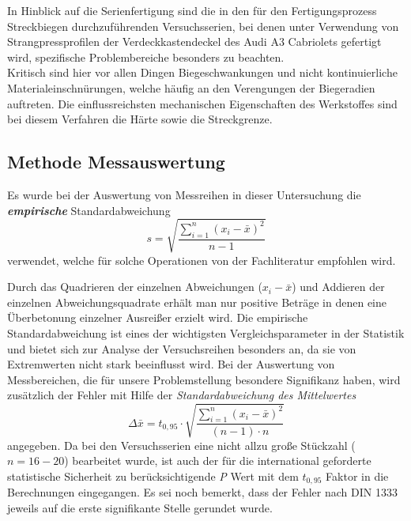 \documentclass[12pt,a4paper,parskip,twoside,BCOR5mm,headsepline]{scrartcl}
\begin{document}
In Hinblick auf die Serienfertigung sind die in den für den Fertigungsprozess  Streckbiegen durchzuführenden Versuchsserien, bei denen unter Verwendung von Strangpressprofilen der Verdeckkastendeckel des Audi A3 Cabriolets gefertigt wird, spezifische Problembereiche besonders zu beachten.\\
Kritisch sind hier vor allen Dingen Biegeschwankungen und nicht kontinuierliche Materialeinschnürungen,  welche häufig an den Verengungen der Biegeradien auftreten. Die einflussreichsten mechanischen Eigenschaften des Werkstoffes sind bei diesem Verfahren die Härte sowie die Streckgrenze.














  











\subsection{Methode Messauswertung}
Es wurde bei der Auswertung von Messreihen in dieser Untersuchung  die \textbf{\emph{empirische}} Standardabweichung 
\begin{equation}
 s= \sqrt{\frac{\sum \limits_{i=1}^n (x_i - \bar{x})^2}{n-1}} 
\end{equation}  verwendet, welche für solche Operationen von der Fachliteratur empfohlen wird.\autocite[301]{mf} 

Durch das Quadrieren der einzelnen Abweichungen ($ x_i-\bar{x}$) und Addieren der einzelnen Abweichungsquadrate erhält man nur positive Beträge in denen eine Überbetonung einzelner Ausreißer erzielt wird.
Die empirische Standardabweichung ist   eines der wichtigsten Vergleichsparameter in der Statistik und bietet sich zur Analyse der Versuchsreihen besonders an, da sie von Extremwerten nicht stark beeinflusst wird.\autocite[54]{gst} Bei der Auswertung von Messbereichen, die für unsere Problemstellung besondere Signifikanz haben, wird zusätzlich der Fehler mit Hilfe der  \emph{Standardabweichung des Mittelwertes }  \begin{equation} \Delta\bar{x}= t_{0,95} \cdot \sqrt{\frac{\sum \limits_{i=1}^n (x_i - \bar{x})^2}{(n-1)\cdot n}}\end{equation}  angegeben.\autocite[16]{ph} Da bei den Versuchsserien eine nicht allzu große Stückzahl ($ n=16-20 $) bearbeitet wurde,  ist auch der für die international geforderte statistische Sicherheit zu berücksichtigende \emph{P} Wert mit dem $ t_{0,95} $ Faktor in die Berechnungen eingegangen.\autocite[609]{tp}  Es sei noch bemerkt, dass der Fehler nach DIN 1333 jeweils auf die erste signifikante Stelle gerundet wurde.\autocite[612]{tp}
 	 	
\end{document}
